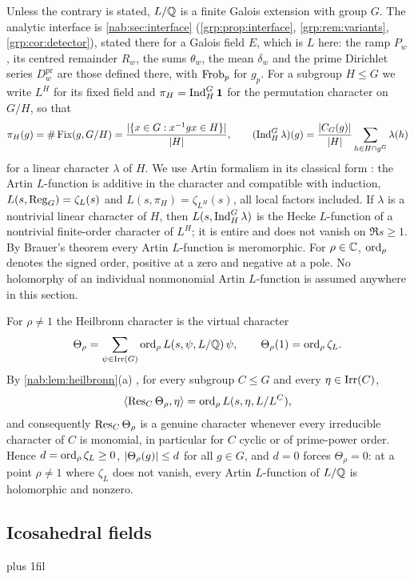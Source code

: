 Unless the contrary is stated, $L/\mathbb{Q}$ is a finite Galois extension with group
$G$. The analytic interface is \cref{nab:sec:interface}
(\cref{grp:prop:interface}, \cref{grp:rem:variants}, \cref{grp:cor:detector}), stated
there for a Galois field $E$, which is $L$ here: the ramp $P_w$, its centred remainder
$R_w$, the sums $\theta_w$, the mean $\delta_w$ and the prime Dirichlet series
$D^{\mathrm{pr}}_w$ are those defined there, with $\operatorname{Frob}_p$ for $g_p$. For a subgroup $H\le G$ we write $L^H$ for its fixed field and
$\pi_H=\operatorname{Ind}_H^G\mathbf{1}$ for the permutation character on $G/H$, so that
\[
 \pi_H(g)=\#\operatorname{Fix}(g,G/H)=\frac{\lvert\{x\in G:x^{-1}gx\in H\}\rvert}{\lvert H\rvert},
 \qquad
 (\operatorname{Ind}_H^G\lambda)(g)=\frac{\lvert C_G(g)\rvert}{\lvert H\rvert}\sum_{h\in H\cap g^G}\lambda(h)
\]
for a linear character $\lambda$ of $H$. We use Artin formalism in its
classical form \cite{Neukirch1999Algebraic,Booker2006Artin}: the Artin
$L$-function is additive in the character and compatible with induction,
$L(s,\operatorname{Reg}_G)=\zeta_L(s)$ and $L(s,\pi_H)=\zeta_{L^H}(s)$, all local factors
included. If $\lambda$ is a nontrivial linear character of $H$, then
$L(s,\operatorname{Ind}_H^G\lambda)$ is the Hecke $L$-function of a nontrivial finite-order
character of $L^H$; it is entire and does not vanish on $\Re s\ge1$. By
Brauer's theorem every Artin $L$-function is meromorphic. For $\rho\in\mathbb{C}$,
$\operatorname{ord}_\rho$ denotes the signed order, positive at a zero and negative at a
pole. No holomorphy of an individual nonmonomial Artin $L$-function is assumed
anywhere in this section.

For $\rho\ne1$ the Heilbronn character is the virtual character
\[
 \Theta_\rho=\sum_{\psi\in\operatorname{Irr}(G)}\operatorname{ord}_\rho L(s,\psi,L/\mathbb{Q})\,\psi,
 \qquad \Theta_\rho(1)=\operatorname{ord}_\rho\zeta_L .
\]
By \cref{nab:lem:heilbronn}(a) \cite{FooteGinsbergMurty2015Heilbronn}, for every
subgroup $C\le G$ and every $\eta\in\operatorname{Irr}(C)$,
\begin{equation}\label{grp:eq:heil}
 \langle\operatorname{Res}_C\Theta_\rho,\eta\rangle=\operatorname{ord}_\rho L(s,\eta,L/L^C),
\end{equation}
and consequently $\operatorname{Res}_C\Theta_\rho$ is a genuine character whenever every
irreducible character of $C$ is monomial, in particular for $C$ cyclic or of
prime-power order. Hence $d=\operatorname{ord}_\rho\zeta_L\ge0$, $\lvert\Theta_\rho(g)\rvert\le d$
for all $g\in G$, and $d=0$ forces $\Theta_\rho=0$: at a point $\rho\ne1$ where
$\zeta_L$ does not vanish, every Artin $L$-function of $L/\mathbb{Q}$ is holomorphic
and nonzero.

\subsection{Icosahedral fields}\label{grp:sec:a5}
{\rightskip=0pt plus 1fil\relax
{}
}


